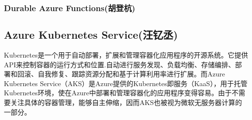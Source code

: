 \documentclass[11pt]{article}
\begin{document}
\subsubsection{Durable Azure Functions(胡登杭)}

\subsection{Azure Kubernetes Service(汪钇丞)}
Kubernetes是一个用于自动部署，扩展和管理容器化应用程序的开源系统。它提供API来控制容器的运行方式和位置.自动进行服务发现、负载均衡、存储编排、部署和回滚、自我修复、跟踪资源分配和基于计算利用率进行扩展。而Azure Kubernetes Service（AKS）是Azure提供的Kubernetes即服务（KaaS），用于托管Kubernetes环境，使在Azure中部署和管理容器化的应用程序变得容易。由于不需要关注具体的容器管理，能够自主伸缩，因而AKS也被视为微软无服务器计算的一部分。
\end{document}
